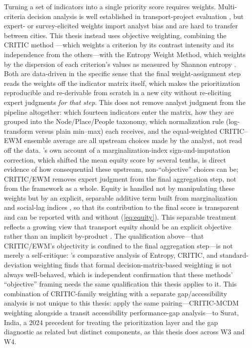 Turning a set of indicators into a single priority score requires weights. Multi-criteria
decision analysis is well established in transport-project evaluation
\parencite{macharis2015}, but expert- or survey-elicited weights import analyst bias and
are hard to transfer between cities. This thesis instead uses objective weighting,
combining the CRITIC method \parencite{diakoulaki1995critic}---which weights a criterion
by its contrast intensity and its independence from the others---with the Entropy Weight
Method, which weights by the dispersion of each criterion's values as measured by Shannon
entropy \parencite{shannon1948}. Both are data-driven in the specific sense that the final
weight-assignment step reads the weights off the indicator matrix itself, which makes the
prioritization reproducible and re-derivable from scratch in a new city without
re-eliciting expert judgments \emph{for that step}. This does not remove analyst judgment
from the pipeline altogether: which fourteen indicators enter the matrix, how they are
grouped into the Node/Place/People taxonomy, which normalization rule (log-transform versus
plain min--max) each receives, and the equal-weighted CRITIC--EWM ensemble average are all
upstream choices made by the analyst, not read off the data. 's
own account of a marginalization-index sign-and-imputation correction, which shifted the
mean equity score by several tenths, is direct evidence of how consequential these upstream,
non-``objective'' choices can be; CRITIC/EWM removes expert judgment from the final
aggregation step, not from the framework as a whole. Equity is
handled not by manipulating these weights but by an explicit, separable additive term
built from marginalization and social-lag indices
\parencite{conapo_marginacion2020, coneval_rezago2020}, so that its contribution to the
final score is transparent and can be reported with and without (\cref{eq:equity}). This
separable treatment reflects a growing view that transport equity should be an explicit
objective rather than an implicit by-product \parencite{martens2016, pereira2017justice}.
The qualification above---that CRITIC/EWM's objectivity is confined to the final
aggregation step---is not merely a self-critique: \textcite{mukhametzyanov2021critic}'s
comparative analysis of Entropy, CRITIC, and standard-deviation weighting finds that
formal decision-matrix-based weighting is not always well-behaved, which is independent
confirmation that these methods' ``objective'' framing needs the same qualification this
thesis applies to it. This combination of CRITIC-family weighting with a separate
gap/accessibility analysis is not unique to this thesis: \textcite{rathod2024critic}
apply the same pairing---CRITIC-MCDM weighting alongside a transit accessibility
performance-gap analysis---to Surat, India, a 2024 precedent for treating the
prioritization layer and the gap diagnostic as related but distinct components, as this
thesis does across W3 and W4.

